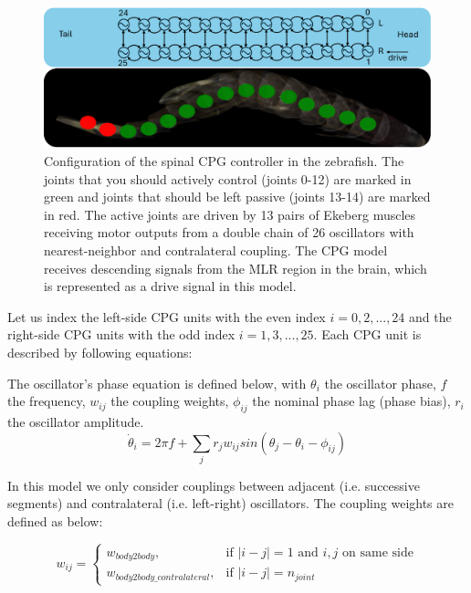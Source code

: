 \documentclass{cmc}
\begin{document}
\begin{figure}[H]
  \centering \includegraphics[width=.8\textwidth]{figures/model_controller.png}
  \caption{\label{fig:model_controller} Configuration of the spinal CPG controller in the zebrafish. The joints that you should actively control (joints 0-12) are marked in green and joints that should be left passive (joints 13-14) are marked in red. The active joints are driven by 13 pairs of Ekeberg muscles receiving motor outputs from a double chain of 26 oscillators with nearest-neighbor and contralateral coupling. The CPG model receives descending signals from the MLR region in the brain, which is represented as a drive signal in this model.}
\end{figure}

Let us index the left-side CPG units with the even index $i=0, 2,...,24$ and the right-side CPG units with the odd index $i=1, 3,...,25$. Each CPG unit is described by following equations:

The oscillator's phase equation is defined below, with $ \theta_i $ the oscillator phase, $f$ the frequency, $ w_{ij} $ the coupling
weights, $ \phi_{ij} $ the nominal phase lag (phase bias), $ r_i $ the
oscillator amplitude.
\begin{equation}
  \label{eq:dphase}
  \dot{\theta}_i = 2 \pi f + \sum_j r_j w_{ij} sin(\theta_j - \theta_i - \phi_{ij})
\end{equation}

In this model we only consider couplings between adjacent (i.e. successive segments) and contralateral (i.e. left-right) oscillators. The coupling weights are defined as below:

\begin{equation}
  \label{eq:dcw}
  w_{ij} =
    \begin{cases}
    w_{body2body},& \text{if } |i-j|=1 \text{ and } i,j \text{ on same side}\\
    w_{body2body\_contralateral}, & \text{if } |i-j|=n_{joint}
    \end{cases}
\end{equation}
\end{document}
